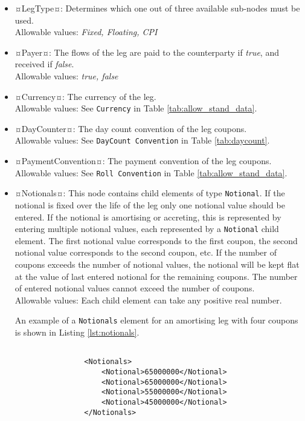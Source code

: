 \begin{itemize}
\item ¤LegType¤:  Determines which one out of three available sub-nodes must be used. \\ Allowable values:  \emph{Fixed, Floating, CPI}
\item ¤Payer¤:  The flows of the leg are paid to the counterparty if \emph{true}, and received if \emph{false}.  \\ Allowable values:  \emph{true, false} 
\item ¤Currency¤: The currency of the leg. \\ Allowable values:  See \lstinline!Currency! in Table \ref{tab:allow_stand_data}.
\item ¤DayCounter¤: The day count convention of the leg coupons. \\Allowable values: See \lstinline!DayCount Convention! in Table \ref{tab:daycount}.
\item ¤PaymentConvention¤: The payment convention of the leg coupons. \\Allowable values: See \lstinline!Roll Convention! in Table \ref{tab:allow_stand_data}.

\item ¤Notionals¤: This node contains child elements of type \lstinline!Notional!. If the notional is fixed over the life of the leg only one notional value should be entered. If the notional is amortising or accreting, this is represented by entering multiple notional values, each represented by a \lstinline!Notional! child element. The first notional value corresponds to the first coupon, the second notional value corresponds to the second coupon, etc. If the number of coupons exceeds the number of notional values, the notional will be kept flat at the value of last entered notional for the remaining coupons.  The number of entered notional values cannot exceed the number of coupons. \\Allowable values: Each child element can take any positive real number.

\vspace{1em}

An example of a \lstinline!Notionals! element for an amortising leg with four coupons is shown in Listing \ref{lst:notionals}.

\begin{lstlisting}[caption=Notionals, label=lst:notionals]

                <Notionals>
                    <Notional>65000000</Notional>
                    <Notional>65000000</Notional>
                    <Notional>55000000</Notional>
                    <Notional>45000000</Notional>
                </Notionals>


\end{lstlisting}
\end{itemize}
